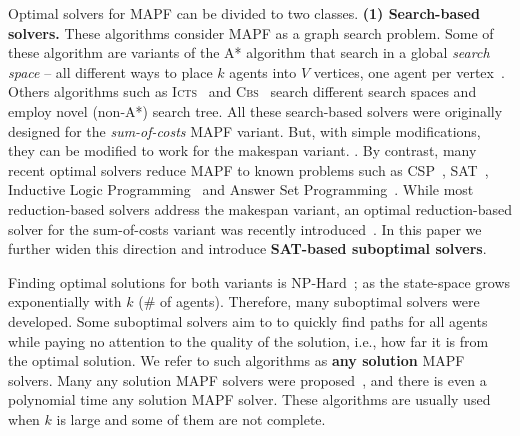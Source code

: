 \documentclass[letterpaper]{article}
\begin{document}
Optimal solvers for MAPF can be divided to two classes.
{\bf (1) Search-based solvers.} These algorithms consider MAPF as a graph search problem. Some of these algorithm are variants of the A* algorithm that search in a global {\em search space} -- all different ways to place $k$ agents into $V$ vertices, one agent per vertex~\cite{standley2010finding,DBLP:journals/ai/WagnerC15}.
Others algorithms such as \textsc{Icts}~\cite{DBLP:journals/ai/SharonSGF13} and \textsc{Cbs}~\cite{CBSJUR,DBLP:conf/ijcai/BoyarskiFSSTBS15} search different search spaces and employ novel (non-A*) search tree. All these search-based solvers were originally designed for the {\em sum-of-costs} MAPF variant.
But, with simple modifications, they can
be modified to work for the makespan variant. . By contrast, many recent optimal solvers
reduce MAPF to known problems such as
CSP~\cite{DBLP:conf/icra/Ryan10}, SAT~\cite{surynek2012towards},
Inductive Logic Programming~\cite{yu2013planning} and Answer Set
Programming~\cite{erdem2013general}. %
While most reduction-based solvers address the makespan variant, an optimal
reduction-based solver for the sum-of-costs variant was recently
introduced~\cite{surynek2016empirical}. In this paper we further widen this
direction and introduce {\bf SAT-based suboptimal solvers}.


Finding optimal solutions for both variants is
NP-Hard~\cite{DBLP:conf/aaai/YuL13,DBLP:conf/aaai/Surynek10}; as the
state-space grows exponentially with $k$ (\# of agents). Therefore, many
suboptimal solvers were developed. Some suboptimal solvers aim to to quickly
find paths for all agents while paying no attention to the quality of the
solution, i.e., how far it is from the optimal solution. We refer to such
algorithms as {\bf any solution} MAPF solvers. Many any solution MAPF solvers
were
proposed~\cite{DBLP:conf/icra/Ryan10,CohenUK15,DBLP:conf/aiide/Silver05,BoteaS15,sajid2012multi},
and there is even a polynomial time any solution MAPF solver. These algorithms
are usually used when $k$ is large and some of  them are not  complete.
\end{document}
